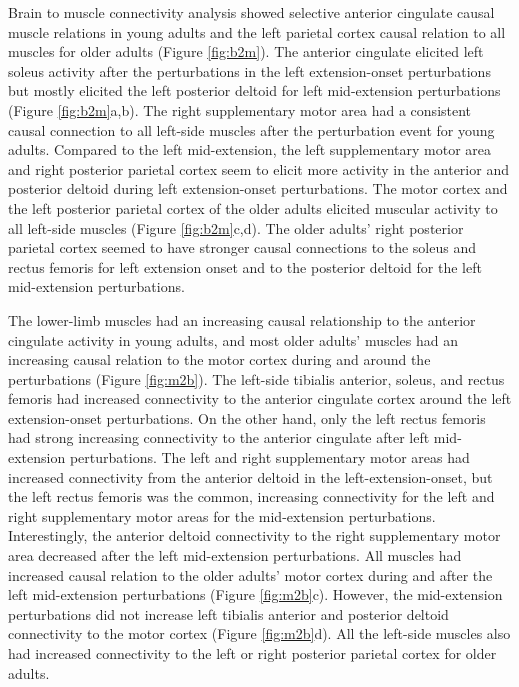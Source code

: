 \documentclass[../thesis_seyed.tex]{subfiles}
\begin{document}
Brain to muscle connectivity analysis showed selective anterior cingulate causal muscle relations in young adults and the left parietal cortex causal relation to all muscles for older adults (Figure \ref{fig:b2m}).  The anterior cingulate elicited left soleus activity after the perturbations in the left extension-onset perturbations but mostly elicited the left posterior deltoid for left mid-extension perturbations (Figure \ref{fig:b2m}a,b). The right supplementary motor area had a consistent causal connection to all left-side muscles after the perturbation event for young adults. Compared to the left mid-extension, the left supplementary motor area and right posterior parietal cortex seem to elicit more activity in the anterior and posterior deltoid during left extension-onset perturbations.  The motor cortex and the left posterior parietal cortex of the older adults elicited muscular activity to all left-side muscles (Figure \ref{fig:b2m}c,d). The older adults’ right posterior parietal cortex seemed to have stronger causal connections to the soleus and rectus femoris for left extension onset and to the posterior deltoid for the left mid-extension perturbations.

The lower-limb muscles had an increasing causal relationship to the anterior cingulate activity in young adults, and most older adults’ muscles had an increasing causal relation to the motor cortex during and around the perturbations (Figure \ref{fig:m2b}). The left-side tibialis anterior, soleus, and rectus femoris had increased connectivity to the anterior cingulate cortex around the left extension-onset perturbations. On the other hand, only the left rectus femoris had strong increasing connectivity to the anterior cingulate after left mid-extension perturbations. The left and right supplementary motor areas had increased connectivity from the anterior deltoid in the left-extension-onset, but the left rectus femoris was the common, increasing connectivity for the left and right supplementary motor areas for the mid-extension perturbations. Interestingly, the anterior deltoid connectivity to the right supplementary motor area decreased after the left mid-extension perturbations. All muscles had increased causal relation to the older adults' motor cortex during and after the left mid-extension perturbations (Figure \ref{fig:m2b}c). However, the mid-extension perturbations did not increase left tibialis anterior and posterior deltoid connectivity to the motor cortex (Figure \ref{fig:m2b}d). All the left-side muscles also had increased connectivity to the left or right posterior parietal cortex for older adults.
\end{document}
